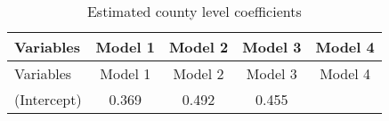 \documentclass[12pt,twoside]{reedthesis}
\begin{document}
  \begin{longtable}[]{@{}lcccc@{}}
  \caption{Estimated county level coefficients
  \label{tab:county_coef}}\tabularnewline
  \toprule
  \begin{minipage}[b]{0.26\columnwidth}\raggedright\strut
  Variables\strut
  \end{minipage} & \begin{minipage}[b]{0.12\columnwidth}\centering\strut
  Model 1\strut
  \end{minipage} & \begin{minipage}[b]{0.14\columnwidth}\centering\strut
  Model 2\strut
  \end{minipage} & \begin{minipage}[b]{0.14\columnwidth}\centering\strut
  Model 3\strut
  \end{minipage} & \begin{minipage}[b]{0.11\columnwidth}\centering\strut
  Model 4\strut
  \end{minipage}\tabularnewline
  \midrule
  \endfirsthead
  \toprule
  \begin{minipage}[b]{0.26\columnwidth}\raggedright\strut
  Variables\strut
  \end{minipage} & \begin{minipage}[b]{0.12\columnwidth}\centering\strut
  Model 1\strut
  \end{minipage} & \begin{minipage}[b]{0.14\columnwidth}\centering\strut
  Model 2\strut
  \end{minipage} & \begin{minipage}[b]{0.14\columnwidth}\centering\strut
  Model 3\strut
  \end{minipage} & \begin{minipage}[b]{0.11\columnwidth}\centering\strut
  Model 4\strut
  \end{minipage}\tabularnewline
  \midrule
  \endhead
  \begin{minipage}[t]{0.26\columnwidth}\raggedright\strut
  (Intercept)\strut
  \end{minipage} & \begin{minipage}[t]{0.12\columnwidth}\centering\strut
  0.369\strut
  \end{minipage} & \begin{minipage}[t]{0.14\columnwidth}\centering\strut
  0.492\strut
  \end{minipage} & \begin{minipage}[t]{0.14\columnwidth}\centering\strut
  0.455\strut
  \end{minipage} & \begin{minipage}[t]{0.11\columnwidth}\centering\strut

\end{minipage}
\end{longtable}
\end{document}

